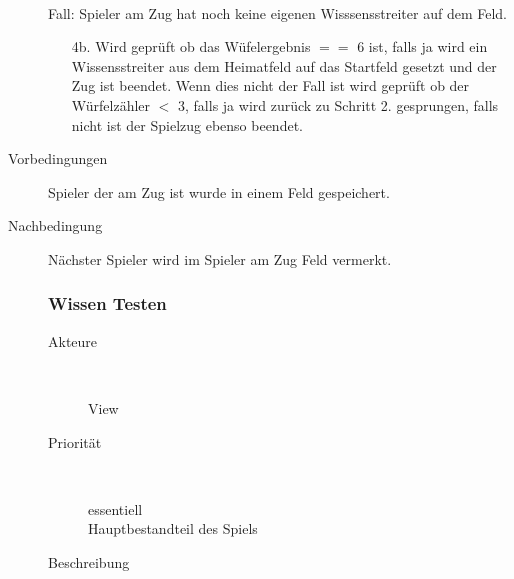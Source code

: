 \documentclass{report}
\begin{document}
\begin{description}
\begin{itemize}
            \end{itemize}
            \\ Fall: Spieler am Zug hat noch keine eigenen Wisssensstreiter auf dem Feld.
            \begin{itemize}
                \item [4b.] Wird geprüft ob das Wüfelergebnis $==$ 6 ist, falls ja wird ein Wissensstreiter aus dem Heimatfeld auf das Startfeld gesetzt und der Zug ist beendet. Wenn dies nicht der Fall ist wird geprüft ob der Würfelzähler $<$ 3, falls ja wird zurück zu Schritt 2. gesprungen, falls nicht ist der Spielzug ebenso beendet.
            \end{itemize}
       \item[Vorbedingungen] Spieler der am Zug ist wurde in einem Feld gespeichert.
       \item[Nachbedingung] Nächster Spieler wird im Spieler am Zug Feld vermerkt.

    \subsubsection{Wissen Testen}
    \begin{description}
        \item[Akteure]~\par
            View
        \item[Priorität]~\par
            essentiell\\Hauptbestandteil des Spiels
        \item[Beschreibung]~\par


\end{description}
\end{description}
\end{document}
